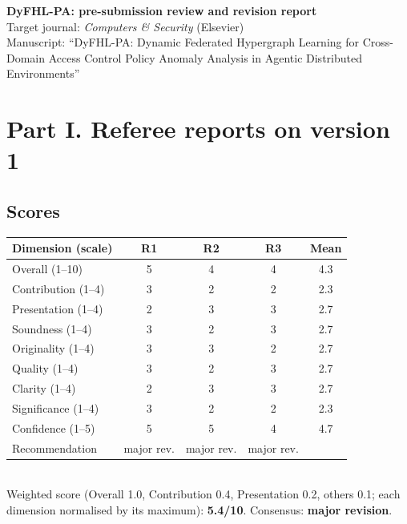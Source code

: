 \documentclass[11pt,a4paper]{article}
\begin{document}
\begin{center}
{\Large\bfseries DyFHL-PA: pre-submission review and revision report}\\[4pt]
Target journal: \emph{Computers \& Security} (Elsevier)\\
Manuscript: ``DyFHL-PA: Dynamic Federated Hypergraph Learning for Cross-Domain Access Control Policy Anomaly Analysis in Agentic Distributed Environments''
\end{center}

\noindent{}

\section*{Part I. Referee reports on version 1}

\subsection*{Scores}
\begin{center}\small
\begin{tabular}{lcccc}
\toprule
Dimension (scale) & R1 & R2 & R3 & Mean\\
\midrule
Overall (1--10) & 5 & 4 & 4 & 4.3\\
Contribution (1--4) & 3 & 2 & 2 & 2.3\\
Presentation (1--4) & 2 & 3 & 3 & 2.7\\
Soundness (1--4) & 3 & 2 & 3 & 2.7\\
Originality (1--4) & 3 & 3 & 2 & 2.7\\
Quality (1--4) & 3 & 2 & 3 & 2.7\\
Clarity (1--4) & 2 & 3 & 3 & 2.7\\
Significance (1--4) & 3 & 2 & 2 & 2.3\\
Confidence (1--5) & 5 & 5 & 4 & 4.7\\
\midrule
Recommendation & major rev. & major rev. & major rev. & \\
\bottomrule
\end{tabular}\\[3pt]
Weighted score (Overall 1.0, Contribution 0.4, Presentation 0.2, others 0.1; each dimension normalised by its maximum): \textbf{5.4/10}. Consensus: \textbf{major revision}.
\end{center}
\end{document}
